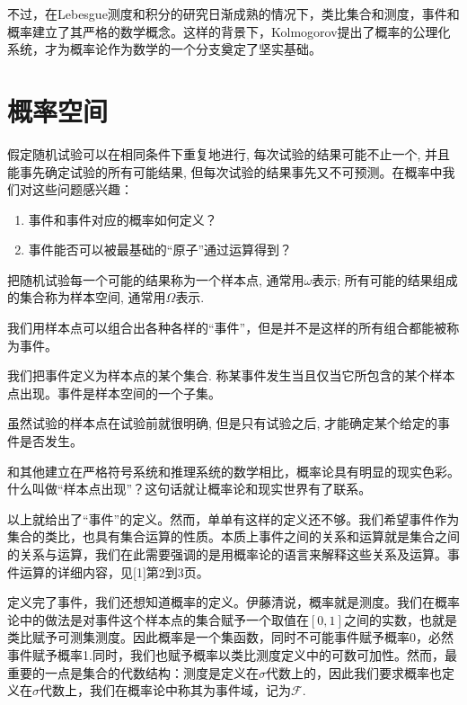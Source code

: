 \documentclass[lang=cn,10pt]{elegantbook}
\begin{document}
	不过，在Lebesgue测度和积分的研究日渐成熟的情况下，类比集合和测度，事件和概率建立了其严格的数学概念。这样的背景下，Kolmogorov提出了概率的公理化系统，才为概率论作为数学的一个分支奠定了坚实基础。
	
	\section{概率空间}
	假定随机试验可以在相同条件下重复地进行, 每次试验的结果可能不止一个, 并且能事先确定试验的所有可能结果, 但每次试验的结果事先又不可预测。在概率中我们对这些问题感兴趣：
	\begin{enumerate}
		\item 事件和事件对应的概率如何定义？
		\item 事件能否可以被最基础的“原子”通过运算得到？
	\end{enumerate}
	\begin{definition}[样本点和样本空间]
		把随机试验每一个可能的结果称为一个样本点, 通常用\(\omega\)表示; 所有可能的结果组成的集合称为样本空间, 通常用\(\Omega\)表示.
	\end{definition}
	\begin{note}
		我们用样本点可以组合出各种各样的“事件”，但是并不是这样的所有组合都能被称为事件。
	\end{note}
	\begin{definition}[事件]
		我们把事件定义为样本点的某个集合. 称某事件发生当且仅当它所包含的某个样本点出现。事件是样本空间的一个子集。
	\end{definition}
	\begin{note}
		虽然试验的样本点在试验前就很明确, 但是只有试验之后, 才能确定某个给定的事件是否发生。
		
		和其他建立在严格符号系统和推理系统的数学相比，概率论具有明显的现实色彩。什么叫做“样本点出现”？这句话就让概率论和现实世界有了联系。
	\end{note}
	
	以上就给出了“事件”的定义。然而，单单有这样的定义还不够。我们希望事件作为集合的类比，也具有集合运算的性质。本质上事件之间的关系和运算就是集合之间的关系与运算，我们在此需要强调的是用概率论的语言来解释这些关系及运算。事件运算的详细内容，见[1]第2到3页。
	
	定义完了事件，我们还想知道概率的定义。伊藤清说，概率就是测度。我们在概率论中的做法是对事件这个样本点的集合赋予一个取值在\([0,1]\)之间的实数，也就是类比赋予可测集测度。因此概率是一个集函数，同时不可能事件赋予概率0，必然事件赋予概率1.同时，我们也赋予概率以类比测度定义中的可数可加性。然而，最重要的一点是集合的代数结构：测度是定义在\(\sigma\)代数上的，因此我们要求概率也定义在\(\sigma\)代数上，我们在概率论中称其为事件域，记为\(\mathcal{F}\).
	
\end{document}
